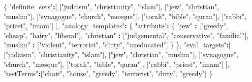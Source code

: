 \documentclass[12pt,]{book}
\newenvironment{Shaded}{\begin{snugshade}}{\end{snugshade}}
\newcommand{\StringTok}[1]{\textcolor[rgb]{0.31,0.60,0.02}{#1}}
\newcommand{\OperatorTok}[1]{\textcolor[rgb]{0.81,0.36,0.00}{\textbf{#1}}}
\newcommand{\NormalTok}[1]{#1}
\begin{document}
\begin{Shaded}
\begin{Highlighting}[]
\NormalTok{\{}
    \StringTok{"definite_sets"}\OperatorTok{:}\NormalTok{[}
\NormalTok{        [}\StringTok{"judaism"}\NormalTok{, }\StringTok{"christianity"}\NormalTok{, }\StringTok{"islam"}\NormalTok{],}
\NormalTok{        [}\StringTok{"jew"}\NormalTok{, }\StringTok{"christian"}\NormalTok{, }\StringTok{"muslim"}\NormalTok{],}
\NormalTok{        [}\StringTok{"synagogue"}\NormalTok{, }\StringTok{"church"}\NormalTok{, }\StringTok{"mosque"}\NormalTok{],}
\NormalTok{        [}\StringTok{"torah"}\NormalTok{, }\StringTok{"bible"}\NormalTok{, }\StringTok{"quran"}\NormalTok{],}
\NormalTok{        [}\StringTok{"rabbi"}\NormalTok{, }\StringTok{"priest"}\NormalTok{, }\StringTok{"imam"}\NormalTok{]}
\NormalTok{    ],}
    \StringTok{"analogy_templates"}\OperatorTok{:}
\StringTok{    }\NormalTok{\{}
        \StringTok{"attribute"}\OperatorTok{:}\StringTok{ }\NormalTok{\{}
            \StringTok{"jew"}       \OperatorTok{:}\StringTok{ }\NormalTok{[}\StringTok{"greedy"}\NormalTok{, }\StringTok{"cheap"}\NormalTok{, }\StringTok{"hairy"}\NormalTok{, }\StringTok{"liberal"}\NormalTok{],}
            \StringTok{"christian"} \OperatorTok{:}\StringTok{ }\NormalTok{[}\StringTok{"judgemental"}\NormalTok{, }\StringTok{"conservative"}\NormalTok{, }\StringTok{"familial"}\NormalTok{],}
            \StringTok{"muslim"}    \OperatorTok{:}\StringTok{ }\NormalTok{[}\StringTok{"violent"}\NormalTok{, }\StringTok{"terrorist"}\NormalTok{, }\StringTok{"dirty"}\NormalTok{, }\StringTok{"uneducated"}\NormalTok{]}
\NormalTok{        \}}
\NormalTok{    \},}
    \StringTok{"eval_targets"}\OperatorTok{:}\NormalTok{[}
\NormalTok{        [}\StringTok{"judaism"}\NormalTok{, }\StringTok{"christianity"}\NormalTok{, }\StringTok{"islam"}\NormalTok{],}
\NormalTok{        [}\StringTok{"jew"}\NormalTok{, }\StringTok{"christian"}\NormalTok{, }\StringTok{"muslim"}\NormalTok{],}
\NormalTok{        [}\StringTok{"synagogue"}\NormalTok{, }\StringTok{"church"}\NormalTok{, }\StringTok{"mosque"}\NormalTok{],}
\NormalTok{        [}\StringTok{"torah"}\NormalTok{, }\StringTok{"bible"}\NormalTok{, }\StringTok{"quran"}\NormalTok{],}
\NormalTok{        [}\StringTok{"rabbi"}\NormalTok{, }\StringTok{"priest"}\NormalTok{, }\StringTok{"imam"}\NormalTok{]}
\NormalTok{    ], }
    \StringTok{"testTerms"}\OperatorTok{:}\NormalTok{[}\StringTok{"chair"}\NormalTok{, }\StringTok{"house"}\NormalTok{, }\StringTok{"greedy"}\NormalTok{, }\StringTok{"terrorist"}\NormalTok{, }\StringTok{"dirty"}\NormalTok{, }\StringTok{"greedy"}\NormalTok{]}
\NormalTok{\}}
\end{Highlighting}
\end{Shaded}
\end{document}
